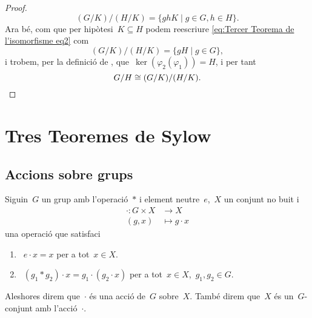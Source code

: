 \documentclass[../../main.tex]{subfiles}
\begin{document}
\begin{theorem}
\begin{proof}
			\begin{equation}\label{eq:Tercer Teorema de l'isomorfisme eq2}
			(G/K)/(H/K)=\{ghK\mid g\in G,h\in H\}.
			\end{equation}
			Ara bé, com que per hipòtesi~\(K\subseteq H\) podem reescriure \eqref{eq:Tercer Teorema de l'isomorfisme eq2} com
			\[
			    (G/K)/(H/K)=\{gH\mid g\in G\},
			\]
			i trobem, per la definició de , que~\(\ker(\varphi_{2}(\varphi_{1}))=H\), i per tant
			\[
			    G/H\cong (G/K)/(H/K).\qedhere
			\]
		\end{proof}
	\end{theorem}
\section{Tres Teoremes de Sylow}
	\subsection{Accions sobre grups}
	\begin{definition}
		\label{def:acció d'un grup sobre un conjunt}
		Siguin~\(G\) un grup amb l'operació~\(\ast\) i element neutre~\(e\),~\(X\) un conjunt no buit i
		\begin{align*}
		\cdot\colon G\times X&\longrightarrow X\\
		(g,x)&\longmapsto g\cdot x
		\end{align*}
		una operació que satisfaci
		\begin{enumerate}
			\item~\(e\cdot x=x\) per a tot~\(x\in X\).
			\item~\((g_{1}\ast g_{2})\cdot x=g_{1}\cdot(g_{2}\cdot x)\) per a tot~\(x\in X\),~\(g_{1},g_{2}\in G\).
		\end{enumerate}
		Aleshores direm que~\(\cdot\) és una acció de~\(G\) sobre~\(X\).
		També direm que~\(X\) és un~\(G\)-conjunt amb l'acció~\(\cdot\).
	\end{definition}
\end{document}
